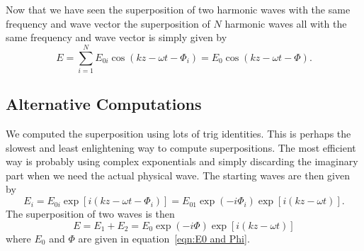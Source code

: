     Now that we have seen the superposition of two harmonic waves with the same frequency and wave vector the superposition of \(N\) harmonic waves all with the same frequency and wave vector is simply given by
    \[E = \sum_{i=1}^{N} E_{0i}\cos(kz - \omega t - \Phi_{i}) = E_0\cos(kz - \omega t - \Phi).\]
    
    \subsection{Alternative Computations}
    We computed the superposition using lots of trig identities.
    This is perhaps the slowest and least enlightening way to compute superpositions.
    The most efficient way is probably using complex exponentials and simply discarding the imaginary part when we need the actual physical wave.
    The starting waves are then given by
    \[E_i = E_{0i}\exp[i(kz - \omega t - \Phi_i)] = E_{01}\exp(-i\Phi_i)\exp[i(kz - \omega t)].\]
    The superposition of two waves is then
    \[E = E_1 + E_2 = E_0\exp(-i\Phi)\exp[i(kz - \omega t)]\]
    where \(E_0\) and \(\Phi\) are given in equation~\ref{eqn:E0 and Phi}.
    
